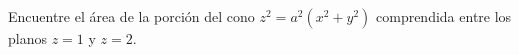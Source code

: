 \item Encuentre el área de la porción del cono $z^2 = a^2(x^2 + y^2)$ comprendida entre los planos $z = 1$ y $z = 2$.
